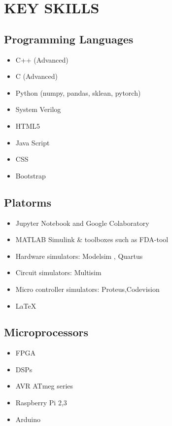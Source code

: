 \documentclass[11pt,a4paper,roman]{moderncv}        %
\begin{document}
{{{\section{KEY SKILLS}
	\begin{minipage}[t]{0.5 \textwidth}
		\subsection{Programming Languages}
		\begin{itemize}
			\item C++ (Advanced)
			\item C (Advanced)
			\item Python (numpy, pandas, sklean, pytorch)
			\item System Verilog
			\item HTML5 
			\item Java Script
			\item CSS
			\item Bootstrap
		\end{itemize}
	\end{minipage}
	\begin{minipage}[t]{0.5 \textwidth}
		\subsection{Platorms}
		\begin{itemize}
			\item Jupyter Notebook and Google Colaboratory
			\item MATLAB Simulink \& toolboxes such as FDA-tool
			\item Hardware simulators: Modelsim , Quartus 
			\item Circuit simulators: Multisim
			\item Micro controller simulators: Proteus,Codevision
			\item \LaTeX
		\end{itemize}
		\subsection{Microprocessors}
		\begin{itemize}
			\item FPGA
			\item DSPs
			\item AVR ATmeg series
			\item Raspberry Pi 2,3
			\item Arduino
		\end{itemize}
	

\end{minipage}}}}
\end{document}
